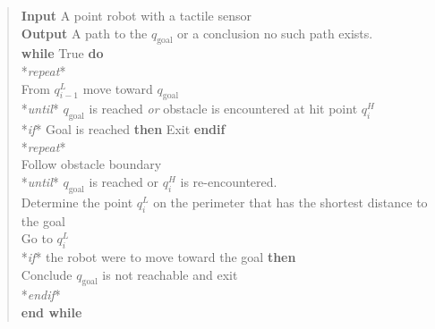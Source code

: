 \begin{quote}
\textbf{Input} A point robot with a tactile sensor\\
\textbf{Output} A path to the \(q_{\text{goal}}\) or a conclusion no
such path exists.\\
\textbf{while} True \textbf{do}\\
\hspace*{0.333em}\hspace*{0.333em}*\emph{repeat}*\\
\hspace*{0.333em}\hspace*{0.333em}\hspace*{0.333em}\hspace*{0.333em}From
\(q^L_{i-1}\) move toward \(q_{\text{goal}}\)\\
\hspace*{0.333em}\hspace*{0.333em}*\emph{until}* \(q_{\text{goal}}\) is
reached \emph{or} obstacle is encountered at hit point \(q^H_{i}\)\\
\hspace*{0.333em}\hspace*{0.333em}*\emph{if}* Goal is reached
\textbf{then} Exit \textbf{endif}\\
\hspace*{0.333em}\hspace*{0.333em}*\emph{repeat}*\\
\hspace*{0.333em}\hspace*{0.333em}\hspace*{0.333em}\hspace*{0.333em}Follow
obstacle boundary\\
\hspace*{0.333em}\hspace*{0.333em}*\emph{until}* \(q_{\text{goal}}\) is
reached or \(q^H_{i}\) is re-encountered.\\
\hspace*{0.333em}\hspace*{0.333em}Determine the point \(q^L_{i}\) on the
perimeter that has the shortest distance to the goal\\
\hspace*{0.333em}\hspace*{0.333em}Go to \(q^L_{i}\)\\
\hspace*{0.333em}\hspace*{0.333em}*\emph{if}* the robot were to move
toward the goal \textbf{then}\\
\hspace*{0.333em}\hspace*{0.333em}Conclude \(q_{\text{goal}}\) is not
reachable and exit\\
\hspace*{0.333em}\hspace*{0.333em}*\emph{endif}*\\
\textbf{end while}
\end{quote}

